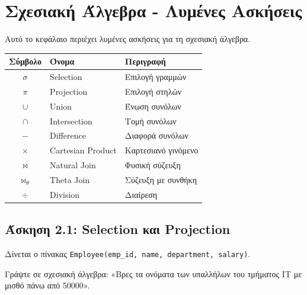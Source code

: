 
\chapter{Σχεσιακή Άλγεβρα - Λυμένες Ασκήσεις}
\label{ch:relational-algebra-exercises}

Αυτό το κεφάλαιο περιέχει λυμένες ασκήσεις για τη σχεσιακή άλγεβρα.

\begin{infobox}
\begin{center}
\begin{tabular}{cll}
\toprule
\textbf{Σύμβολο} & \textbf{Όνομα} & \textbf{Περιγραφή} \\
\midrule
$\sigma$ & Selection & Επιλογή γραμμών \\
$\pi$ & Projection & Επιλογή στηλών \\
$\cup$ & Union & Ένωση συνόλων \\
$\cap$ & Intersection & Τομή συνόλων \\
$-$ & Difference & Διαφορά συνόλων \\
$\times$ & Cartesian Product & Καρτεσιανό γινόμενο \\
$\bowtie$ & Natural Join & Φυσική σύζευξη \\
$\bowtie_\theta$ & Theta Join & Σύζευξη με συνθήκη \\
$\div$ & Division & Διαίρεση \\
\bottomrule
\end{tabular}
\end{center}
\end{infobox}

\section{Άσκηση 2.1: Selection και Projection}

\begin{formulabox}[Εκφώνηση]
Δίνεται ο πίνακας \texttt{Employee(emp\_id, name, department, salary)}.

Γράψτε σε σχεσιακή άλγεβρα: «Βρες τα ονόματα των υπαλλήλων του τμήματος IT με
μισθό πάνω από 50000».
\end{formulabox}

